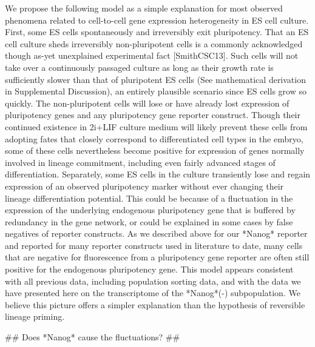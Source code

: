 \documentclass[aps,prl,twocolumn,superscriptaddress]{revtex4}
\begin{document}
We propose the following model as a simple explanation for most observed phenomena related to cell-to-cell gene expression heterogeneity in ES cell culture. First, some ES cells spontaneously and irreversibly exit pluripotency. That an ES cell culture sheds irreversibly non-pluripotent cells is a commonly acknowledged though as-yet unexplained experimental fact [SmithCSC13]. Such cells will not take over a continuously passaged culture as long as their growth rate is sufficiently slower than that of pluripotent ES cells (See mathematical derivation in Supplemental Discussion), an entirely plausible scenario since ES cells grow so quickly. The non-pluripotent cells will lose or have already lost expression of pluripotency genes and any pluripotency gene reporter construct. Though their continued existence in 2i+LIF culture medium will likely prevent these cells from adopting fates that closely correspond to differentiated cell types in the embryo, some of these cells nevertheless become positive for expression of genes normally involved in lineage commitment, including even fairly advanced stages of differentiation.
Separately, some ES cells in the culture transiently lose and regain expression of an observed pluripotency marker without ever changing their lineage differentiation potential. This could be because of a fluctuation in the expression of the underlying endogenous pluripotency gene that is buffered by redundancy in the gene network, or could be explained in some cases by false negatives of reporter constructs. As we described above for our *Nanog* reporter and \citet{FaddahCSC13} reported for many reporter constructs used in literature to date, many cells that are negative for fluorescence from a pluripotency gene reporter are often still positive for the endogenous pluripotency gene. This model appears consistent with all previous data, including population sorting data, and with the data we have presented here on the transcriptome of the *Nanog*(-) subpopulation. We believe this picture offers a simpler explanation than the hypothesis of reversible lineage priming.

## Does *Nanog* cause the fluctuations? ##
\end{document}
